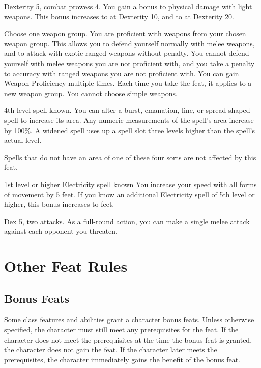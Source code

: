 \featpres Dexterity 5, combat prowess 4.
\featben You gain a  bonus to physical damage with light weapons.
This bonus increases to  at Dexterity 10, and to  at Dexterity 20.

Choose one weapon group.
\featben You are proficient with weapons from your chosen weapon group.
This allows you to defend yourself normally with melee weapons, and to attack with exotic ranged weapons without penalty.
You cannot defend yourself with melee weapons you are not proficient with, and you take a  penalty to accuracy with ranged weapons you are not proficient with.
You can gain Weapon Proficiency multiple times.
Each time you take the feat, it applies to a new weapon group.
You cannot choose simple weapons.

\featpre 4th level spell known.
\featben You can alter a burst, emanation, line, or spread shaped spell to increase its area.
Any numeric measurements of the spell's area increase by 100\%.
A widened spell uses up a spell slot three levels higher than the spell's actual level.
\par Spells that do not have an area of one of these four sorts are not affected by this feat.

\featpre 1st level or higher Electricity spell known
\featben You increase your speed with all forms of movement by 5 feet.
If you know an additional Electricity spell of 5th level or higher, this bonus increases to  feet.

\featpres Dex 5, two attacks.
\featben As a full-round action, you can make a single melee attack against each opponent you threaten.

\section{Other Feat Rules}

\subsection{Bonus Feats}
Some class features and abilities grant a character bonus feats.
Unless otherwise specified, the character must still meet any prerequisites for the feat.
If the character does not meet the prerequisites at the time the bonus feat is granted, the character does not gain the feat.
If the character later meets the prerequisites, the character immediately gains the benefit of the bonus feat.

